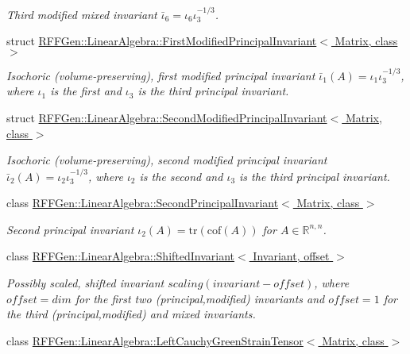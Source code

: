 \begin{DoxyCompactItemize}
\begin{DoxyCompactList}\small\item\em Third modified mixed invariant $\bar\iota_6=\iota_6\iota_3^{-1/3}$. \end{DoxyCompactList}\item 
struct \hyperlink{structRFFGen_1_1LinearAlgebra_1_1FirstModifiedPrincipalInvariant}{R\-F\-F\-Gen\-::\-Linear\-Algebra\-::\-First\-Modified\-Principal\-Invariant$<$ Matrix, class $>$}
\begin{DoxyCompactList}\small\item\em Isochoric (volume-\/preserving), first modified principal invariant $ \bar\iota_1(A)=\iota_1\iota_3^{-1/3} $, where $\iota_1$ is the first and $\iota_3$ is the third principal invariant. \end{DoxyCompactList}\item 
struct \hyperlink{structRFFGen_1_1LinearAlgebra_1_1SecondModifiedPrincipalInvariant}{R\-F\-F\-Gen\-::\-Linear\-Algebra\-::\-Second\-Modified\-Principal\-Invariant$<$ Matrix, class $>$}
\begin{DoxyCompactList}\small\item\em Isochoric (volume-\/preserving), second modified principal invariant $ \bar\iota_2(A)=\iota_2\iota_3^{-1/3} $, where $\iota_2$ is the second and $\iota_3$ is the third principal invariant. \end{DoxyCompactList}\item 
class \hyperlink{classRFFGen_1_1LinearAlgebra_1_1SecondPrincipalInvariant}{R\-F\-F\-Gen\-::\-Linear\-Algebra\-::\-Second\-Principal\-Invariant$<$ Matrix, class $>$}
\begin{DoxyCompactList}\small\item\em Second principal invariant $ \iota_2(A)=\mathrm{tr}(\mathrm{cof}(A)) $ for $A\in\mathbb{R}^{n,n}$. \end{DoxyCompactList}\item 
class \hyperlink{classRFFGen_1_1LinearAlgebra_1_1ShiftedInvariant}{R\-F\-F\-Gen\-::\-Linear\-Algebra\-::\-Shifted\-Invariant$<$ Invariant, offset $>$}
\begin{DoxyCompactList}\small\item\em Possibly scaled, shifted invariant $scaling (invariant - offset)$, where $offset = dim$ for the first two (principal,modified) invariants and $offset = 1$ for the third (principal,modified) and mixed invariants. \end{DoxyCompactList}\item 
class \hyperlink{classRFFGen_1_1LinearAlgebra_1_1LeftCauchyGreenStrainTensor}{R\-F\-F\-Gen\-::\-Linear\-Algebra\-::\-Left\-Cauchy\-Green\-Strain\-Tensor$<$ Matrix, class $>$}

\end{DoxyCompactItemize}
